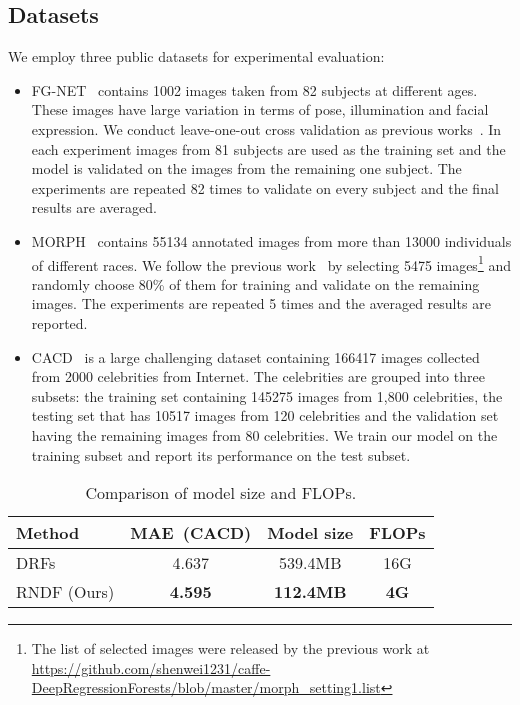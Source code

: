 \documentclass{bmvc2k}
\begin{document}
\subsection{Datasets}
We employ three public datasets for experimental evaluation:
\begin{itemize}
	\item[1.] FG-NET~\cite{FGNET} contains 1002 images taken from 82 subjects at different ages. These images have large variation in terms of pose, illumination and facial expression. We conduct leave-one-out cross validation as previous works~\cite{DEX, DRFs}. In each experiment images from 81 subjects are used as the training set and the model is validated on the images from the remaining one subject. The experiments are repeated 82 times to validate on every subject and the final results are averaged.
	\item[2.] MORPH~\cite{MORPH} contains 55134 annotated images from more than 13000 individuals of different races. We follow the previous work~\cite{DRFs} by selecting 5475 images\footnote{The list of selected images were released by the previous work at \url{https://github.com/shenwei1231/caffe-DeepRegressionForests/blob/master/morph_setting1.list}} and randomly choose 80\% of them for training and validate on the remaining images. The experiments are repeated 5 times and the averaged results are reported. 
	\item[3.] CACD~\cite{CACD} is a large challenging dataset containing 166417 images collected from 2000 celebrities from Internet. The celebrities are grouped into three subsets: the training set containing 145275 images from 1,800 celebrities, the testing set that has 10517 images from 120 celebrities and the validation set having the remaining images from 80 celebrities. We train our model on the training subset and report its performance on the test subset. 
\end{itemize}

\begin{table}
	\begin{center}
		\begin{tabular}{|l|c|c|c|}
			\hline
			Method & MAE~(CACD) & Model size & FLOPs\\
			\hline\hline
			DRFs~\cite{DRFs} &4.637 & 539.4MB & 16G \\
			RNDF (Ours) &\textbf{4.595} & \textbf{112.4MB} & \textbf{4G} \\
			\hline
		\end{tabular}
	\end{center}
	\caption{Comparison of model size and FLOPs.}
	\label{comparison2}
\end{table}
\end{document}

